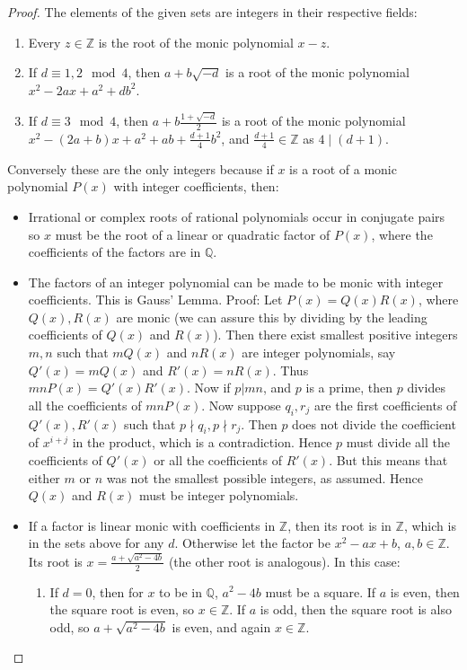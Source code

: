 \documentclass[12pt]{article}
\newcommand{\ints}{{\mathbb{Z}}}
\newcommand{\qf}{{\mathbb{Q}}}
\begin{document}
\begin{proof}
The elements of the given sets are integers in their respective fields:
\begin{enumerate}
\item Every $z \in \ints$ is the root of the monic polynomial $x - z$.
\item If $d \equiv 1, 2 \mod 4$, then $a + b\sqrt{-d}$ is a root of the monic polynomial $x^2 - 2ax + a^2 + db^2$.
\item If $d \equiv 3 \mod 4$, then $a + b\frac{1 + \sqrt{-d}}{2}$ is a root of the monic polynomial $x^2 - (2a + b)x + a^2 + ab + \frac{d+1}{4}b^2$, and $\frac{d+1}{4} \in \ints$ as $4 \mid (d + 1)$.
\end{enumerate}
Conversely these are the only integers because if $x$ is a root of a monic polynomial $P(x)$ with integer coefficients, then:
\begin{itemize}
\item Irrational or complex roots of rational polynomials occur in conjugate pairs so $x$ must be the root of a linear or quadratic factor of $P(x)$, where the coefficients of the factors are in $\qf$.
\item The factors of an integer polynomial can be made to be monic with integer coefficients. This is Gauss' Lemma. Proof: Let $P(x) = Q(x) R(x)$, where $Q(x), R(x)$ are monic (we can assure this by dividing by the leading coefficients of $Q(x)$ and $R(x)$). Then there exist smallest positive integers $m, n$ such that $m Q(x)$ and $n R(x)$ are integer polynomials, say $Q'(x) = mQ(x)$ and $R'(x) = nR(x)$. Thus $mn P(x) = Q'(x) R'(x)$. Now if $p | mn$, and $p$ is a prime, then $p$ divides all the coefficients of $mnP(x)$. Now suppose $q_i, r_j$ are the first coefficients of $Q'(x), R'(x)$  such that $p \nmid q_i, p \nmid r_j$. Then $p$ does not divide the coefficient of $x^{i+j}$ in the product, which is a contradiction. Hence $p$ must divide all the coefficients of $Q'(x)$ or all the coefficients of $R'(x)$. But this means that either $m$ or $n$ was not the smallest possible integers, as assumed. Hence $Q(x)$ and $R(x)$ must be integer polynomials.
\item If a factor is linear monic with coefficients in $\ints$, then its root is in $\ints$, which is in the sets above for any $d$. Otherwise let the factor be $x^2 - ax + b$, $a, b \in \ints$. Its root is $x = \frac{a + \sqrt{a^2 - 4b}}{2}$ (the other root is analogous).  In this case:
\begin{enumerate}
\item If $d = 0$, then for $x$ to be in $\qf$,  $a^2 - 4b$ must be a square.  If $a$ is even, then the square root is even, so $x \in \ints$. If $a$ is odd, then the square root is also odd, so $a + \sqrt{a^2 - 4b}$ is even, and again $x \in \ints$.

\end{enumerate}
\end{itemize}
\end{proof}
\end{document}
